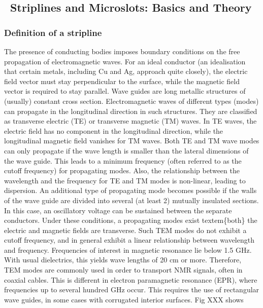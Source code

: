 \subsection{~Striplines and Microslots: Basics and
Theory}\label{striplines-and-microslots-basics-and-theory}

\subsubsection{Definition of a
stripline}\label{definition-of-a-stripline}

The presence of conducting bodies imposes boundary conditions on the
free propagation of electromagnetic waves. For an ideal conductor (an
idealisation that certain metals, including Cu and Ag, approach quite
closely), the electric field vector must stay perpendicular to the
surface, while the magnetic field vector is required to stay parallel.
Wave guides are long metallic structures of (usually) constant cross
section. Electromagnetic waves of different types (modes) can propagate
in the longitudinal direction in such structures. They are classified as
transverse electric (TE) or transverse magnetic (TM) waves. In TE waves,
the electric field has no component in the longitudinal direction, while
the longitudinal magnetic field vanishes for TM waves. Both TE and TM
wave modes can only propagate if the wave length is smaller than the
lateral dimensions of the wave guide. This leads to a minimum frequency
(often referred to as the cutoff frequency) for propagating modes. Also,
the relationship between the wavelength and the frequency for TE and TM
modes is non-linear, leading to dispersion. An additional type of
propagating mode becomes possible if the walls of the wave guide are
divided into several (at least 2) mutually insulated sections. In this
case, an oscillatory voltage can be sustained between the separate
conductors. Under these conditions, a propagating modes exist
textem\{both\} the electric and magnetic fields are transverse. Such TEM
modes do not exhibit a cutoff frequency, and in general exhibit a linear
relationship between wavelength and frequency. Frequencies of interest
in magnetic resonance lie below 1.5 GHz. With usual dielectrics, this
yields wave lengths of 20 cm or more. Therefore, TEM modes are commonly
used in order to transport NMR signals, often in coaxial cables. This is
different in electron paramagnetic resonance (EPR), where frequencies up
to several hundred GHz occur. This requires the use of rectangular wave
guides, in some cases with corrugated interior surfaces. Fig XXX shows
